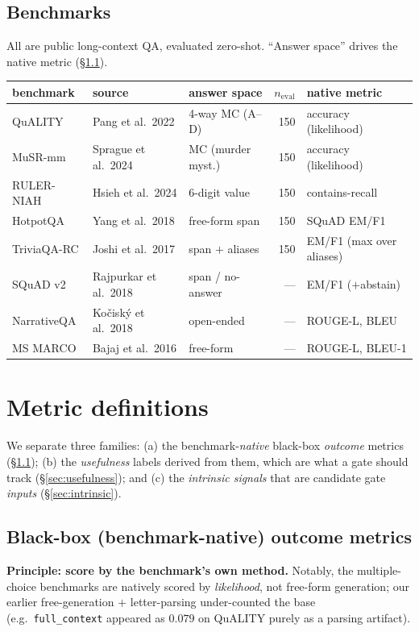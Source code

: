 \documentclass[11pt]{article}
\newcommand{\fullctx}{\texttt{full\_context}}
\begin{document}
\subsection{Benchmarks}
\label{sec:benchmarks}
All are public long-context QA, evaluated zero-shot. ``Answer space''
drives the native metric (\S\ref{sec:native}).
\begin{center}\small
\begin{tabular}{lllr l}
\toprule
benchmark & source & answer space & $n_{\mathrm{eval}}$ & native metric\\
\midrule
QuALITY      & Pang et al.\ 2022      & 4-way MC (A--D)     & 150 & accuracy (likelihood)\\
MuSR-mm      & Sprague et al.\ 2024   & MC (murder myst.)   & 150 & accuracy (likelihood)\\
RULER-NIAH   & Hsieh et al.\ 2024     & 6-digit value       & 150 & contains-recall\\
HotpotQA     & Yang et al.\ 2018      & free-form span      & 150 & SQuAD EM/F1\\
TriviaQA-RC  & Joshi et al.\ 2017     & span $+$ aliases    & 150 & EM/F1 (max over aliases)\\
SQuAD v2     & Rajpurkar et al.\ 2018 & span / no-answer    & --- & EM/F1 ($+$abstain)\\
NarrativeQA  & Ko\v{c}isk\'y et al.\ 2018 & open-ended       & --- & ROUGE-L, BLEU\\
MS MARCO     & Bajaj et al.\ 2016     & free-form          & --- & ROUGE-L, BLEU-1\\
\bottomrule
\end{tabular}
\end{center}

\section{Metric definitions}
\label{sec:metrics}

We separate three families: (a) the benchmark-\emph{native} black-box
\emph{outcome} metrics (\S\ref{sec:native}); (b) the \emph{usefulness}
labels derived from them, which are what a gate should track
(\S\ref{sec:usefulness}); and (c) the \emph{intrinsic signals} that are
candidate gate \emph{inputs} (\S\ref{sec:intrinsic}).

\subsection{Black-box (benchmark-native) outcome metrics}
\label{sec:native}
\textbf{Principle: score by the benchmark's own method.} Notably, the
multiple-choice benchmarks are natively scored by \emph{likelihood}, not
free-form generation; our earlier free-generation $+$ letter-parsing
under-counted the base (e.g.\ \fullctx{} appeared as $0.079$ on QuALITY
purely as a parsing artifact).
\end{document}
